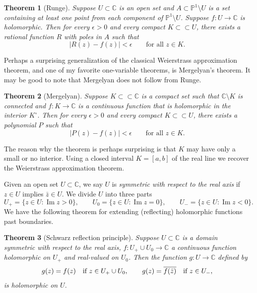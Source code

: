 \documentclass[12pt,openany]{book}
\newcommand{\avoidbreak}{\postdisplaypenalty=100}
\renewcommand{\Im}{\operatorname{Im}}
\newcommand{\sabs}[1]{\lvert {#1} \rvert}
\newcommand{\C}{{\mathbb{C}}}
\newcommand{\bP}{{\mathbb{P}}}
\newcommand{\myindex}[1]{#1\index{#1}}
\theoremstyle{plain}
\newtheorem{thm}{Theorem}[section]
\theoremstyle{remark}
\theoremstyle{definition}
\theoremstyle{exercise}
\theoremstyle{example}
\begin{document}
\begin{thm}[Runge]
Suppose $U \subset \C$ is an open set and $A \subset \bP^1 \setminus U$
is a set containing at least one point from each component of
$\bP^1 \setminus U$.  Suppose $f \colon U \to \C$ is holomorphic.
Then for every $\epsilon > 0$ and every compact
$K \subset \subset U$, there exists a rational function $R$ with poles in $A$
such that
\begin{equation*}
\sabs{R(z) - f(z)} < \epsilon \qquad \text{for all $z \in K$}.
\end{equation*}
\end{thm}

Perhaps a surprising generalization of the
classical Weierstrass approximation theorem,
and one of my favorite one-variable theorems,
is Mergelyan's theorem.
It may be good to note that Mergelyan does not follow from Runge.

\begin{thm}[Mergelyan] \label{thm:mergelyan}
Suppose $K \subset \subset \C$ is a compact set such that $\C \setminus K$
is connected and
$f \colon K \to \C$ is a continuous function that is
holomorphic in the interior $K^\circ$.
Then for every $\epsilon > 0$ and every compact
$K \subset \subset U$, there exists a polynomial $P$
such that
\begin{equation*}
\sabs{P(z) - f(z)} < \epsilon \qquad \text{for all $z \in K$}.
\end{equation*}
\end{thm}

The reason why the theorem is perhaps
surprising is that $K$ may have only a
small or no interior.  Using a closed interval $K=[a,b]$ of the real line we
recover the Weierstrass approximation theorem.

\medskip

Given an open set $U \subset \C$, we say $U$ is
\emph{\myindex{symmetric with respect to the real axis}} if
$z \in U$ implies $\bar{z} \in U$.  We divide $U$ into
three parts
\begin{equation*}
U_+ = \{ z \in U : \Im z > 0 \}, \qquad
U_0 = \{ z \in U : \Im z = 0 \}, \qquad
U_- = \{ z \in U : \Im z < 0 \}.
\end{equation*}
We have the following theorem for extending (reflecting) holomorphic functions past
boundaries.

\begin{thm}[Schwarz reflection principle]
%
Suppose $U \subset \C$ is a domain symmetric with respect to the real axis,
$f \colon U_+ \cup U_0 \to \C$ a continuous function holomorphic on $U_+$
and real-valued on $U_0$.  Then the function $g \colon U \to \C$
defined by
\begin{equation*}
g(z) = f(z) \quad \text{if $z \in U_+ \cup U_0$},
\qquad
g(z) =
\overline{f(\bar{z})} \quad \text{if $z \in U_-$},
\avoidbreak
\end{equation*}
is holomorphic on $U$.
\end{thm}
\end{document}
